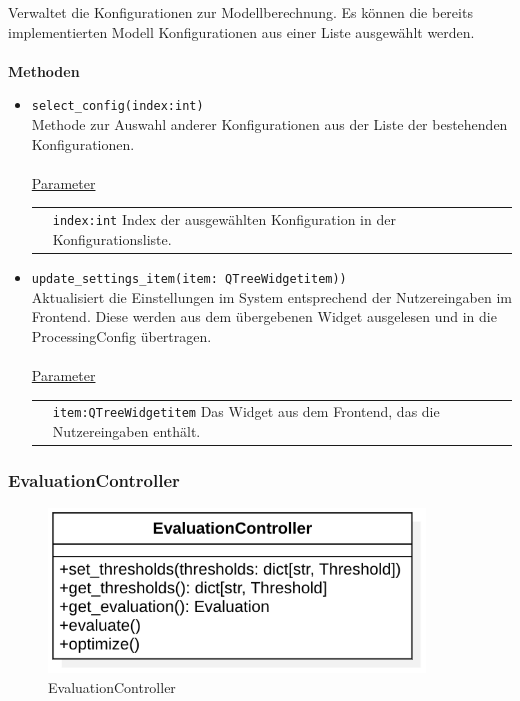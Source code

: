\documentclass{article}
\begin{document}
Verwaltet die Konfigurationen zur Modellberechnung. Es können die bereits implementierten Modell Konfigurationen aus einer Liste ausgewählt werden. \\\\
\textbf{\large{Methoden}}
\begin{itemize}
\item \texttt{select\_config(index:int)}\\ Methode zur Auswahl anderer Konfigurationen aus der Liste der bestehenden Konfigurationen.\\\\
\underline{{Parameter}}\\
\begin{tabular}{lp{10.7cm}}
 & \texttt{index:int} Index der ausgewählten Konfiguration in der Konfigurationsliste. \\
\end{tabular}
\item \texttt{update\_settings\_item(item: QTreeWidgetitem))}\\ Aktualisiert die Einstellungen im System entsprechend der Nutzereingaben im Frontend. Diese werden aus dem übergebenen Widget ausgelesen und in die ProcessingConfig übertragen.\\\\
\underline{{Parameter}}\\
\begin{tabular}{lp{10.7cm}}
 & \texttt{item:QTreeWidgetitem} Das Widget aus dem Frontend, das die Nutzereingaben enthält. \\
\end{tabular}
\end{itemize}


\newpage
\subsubsection*{\large{\textbf{EvaluationController}\label{cls:EvaluationController}}}\normalsize

\begin{figure}[H]%
    \centering
    \includegraphics[width=10cm]{entwurf/Floriane/EvaluationController.png}
    \caption{EvaluationController}
\end{figure}
\end{document}
